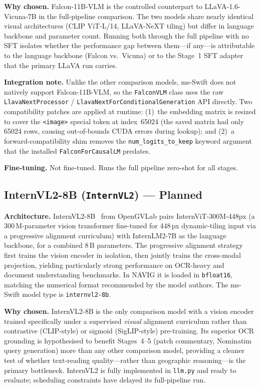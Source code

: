 \documentclass[11pt]{article}
\begin{document}
\textbf{Why chosen.} Falcon-11B-VLM is the controlled counterpart to LLaVA-1.6-Vicuna-7B
in the full-pipeline comparison. The two models share nearly identical visual architectures
(CLIP ViT-L/14, LLaVA-NeXT tiling) but differ in language backbone and parameter count.
Running both through the full pipeline with no SFT isolates whether the performance gap
between them---if any---is attributable to the language backbone (Falcon vs.\ Vicuna) or to
the Stage~1 SFT adapter that the primary LLaVA run carries.

\textbf{Integration note.} Unlike the other comparison models, ms-Swift does not natively
support Falcon-11B-VLM, so the \texttt{FalconVLM} class uses the raw
\texttt{LlavaNextProcessor} / \texttt{LlavaNextForConditionalGeneration} API directly. Two
compatibility patches are applied at runtime: (1)~the embedding matrix is resized to cover
the \texttt{<image>} special token at index~65024 (the saved matrix had only 65024 rows,
causing out-of-bounds CUDA errors during lookup); and (2)~a forward-compatibility shim
removes the \texttt{num\_logits\_to\_keep} keyword argument that the installed
\texttt{FalconForCausalLM} predates.

\textbf{Fine-tuning.} Not fine-tuned. Runs the full pipeline zero-shot for all stages.

\subsection{InternVL2-8B (\texttt{InternVL2}) --- Planned}
\label{sec:internvl2}

\textbf{Architecture.} InternVL2-8B~\citep{Chen2024InternVL} from OpenGVLab pairs
InternViT-300M-448px (a 300\,M-parameter vision transformer fine-tuned for 448\,px
dynamic-tiling input via a progressive alignment curriculum) with InternLM2-7B as
the language backbone, for a combined 8\,B parameters. The progressive alignment strategy
first trains the vision encoder in isolation, then jointly trains the cross-modal
projection, yielding particularly strong performance on OCR-heavy and document
understanding benchmarks. In NAVIG it is loaded in \texttt{bfloat16}, matching the
numerical format recommended by the model authors. The ms-Swift model type is
\texttt{internvl2-8b}.

\textbf{Why chosen.} InternVL2-8B is the only comparison model with a vision encoder
trained specifically under a supervised \emph{visual} alignment curriculum rather than
contrastive (CLIP-style) or sigmoid (SigLIP-style) pre-training. Its superior OCR
grounding is hypothesised to benefit Stages~4--5 (patch commentary, Nominatim query
generation) more than any other comparison model, providing a cleaner test of whether
text-reading quality---rather than geographic reasoning---is the primary bottleneck.
InternVL2 is fully implemented in \texttt{llm.py} and ready to evaluate; scheduling
constraints have delayed its full-pipeline run.
\end{document}
